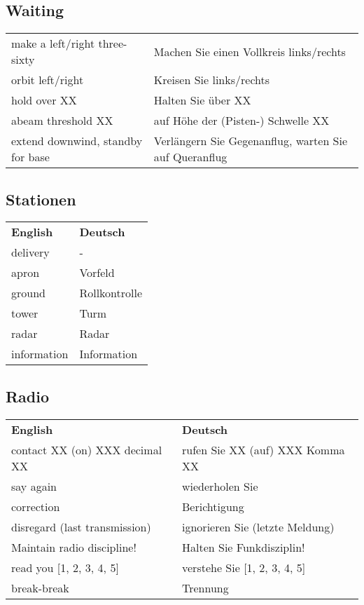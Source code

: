 \subsection{Waiting}
\begin{table}[H]
	\begin{tabularx}{\textwidth}{XX}
		make a left/right three-sixty     & Machen Sie einen Vollkreis links/rechts               \\
		orbit left/right   & Kreisen Sie links/rechts           \\
		hold over XX       & Halten Sie über XX                 \\
		abeam threshold XX & auf Höhe der (Pisten-) Schwelle XX \\
		extend downwind, standby for base & Verlängern Sie Gegenanflug, warten Sie auf Queranflug
	\end{tabularx}
\end{table}

\subsection{Stationen}
\begin{table}[H]
	\begin{tabularx}{\textwidth}{XX}
		\textbf{English} 					& \textbf{Deutsch} 				   \\
		delivery							&-   							   \\
		apron								&Vorfeld   						   \\
		ground								&Rollkontrolle   				   \\
		tower								&Turm     						   \\
		radar								&Radar						   	   \\
		information							&Information					   
	\end{tabularx}
\end{table}

\subsection{Radio}
\begin{table}[H]
	\begin{tabularx}{\textwidth}{XX}
		\textbf{English} 					& \textbf{Deutsch}                 \\
		contact XX (on) XXX decimal XX		& rufen Sie XX (auf) XXX Komma XX  \\
		say again                     		& wiederholen Sie                  \\
		correction                    		& Berichtigung                     \\
		disregard (last transmission)		& ignorieren Sie (letzte Meldung)  \\
		Maintain radio discipline!   		& Halten Sie Funkdisziplin!        \\
		read you {[}1, 2, 3, 4, 5{]} 		& verstehe Sie {[}1, 2, 3, 4, 5{]} \\
		break-break                   		& Trennung                        
	\end{tabularx}
\end{table}